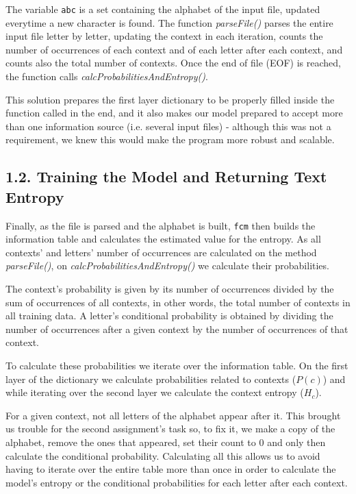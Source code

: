 \documentclass[12pt]{article}
\begin{document}
\newpage
The variable \texttt{abc} is a set containing the alphabet of the input file, 
updated everytime a new character is found.
The function {\it parseFile()\/} parses the entire input file letter by letter,
updating the context in each iteration, counts the number of occurrences of each
context and of each letter after each context, and counts also the total number
of contexts.
Once the end of file (EOF) is reached, the function calls 
{\it calcProbabilitiesAndEntropy()\/}.

This solution prepares the first layer dictionary to be properly filled inside
the function called in the end, and it also makes our model prepared to accept 
more than one information source (i.e. several input files) - although this was 
not a requirement, we knew this would make the program more robust and scalable.

\subsection*{1.2. Training the Model and Returning Text Entropy}

Finally, as the file is parsed and the alphabet is built, \texttt{fcm} then 
builds the information table and calculates the estimated value for the entropy. 
As all contexts' and letters' number of occurrences are calculated on the
method {\it parseFile()}, on {\it calcProbabilitiesAndEntropy()} we
calculate their probabilities. 

The context's probability is given by its number of occurrences divided 
by the sum of occurrences of all contexts, in other words, the total number 
of contexts in all training data.
A letter's conditional probability is obtained by dividing the number of 
occurrences after a given context by the number of occurrences of that context.

To calculate these probabilities we iterate over the information table.
On the first layer of the dictionary we calculate probabilities related to
contexts (\(P(c)\)) and while iterating over the second layer we calculate
the context entropy (\(H_c\)). 

For a given context, not all letters of the alphabet appear after it.
This brought us trouble for the second assignment's task so, to fix it,
we make a copy of the alphabet, remove the ones that appeared, set their 
count to 0 and only then calculate the conditional probability.
Calculating all this allows us to avoid having to iterate over the entire 
table more than once in order to calculate the model's entropy or the 
conditional probabilities for each letter after each context.
\end{document}
